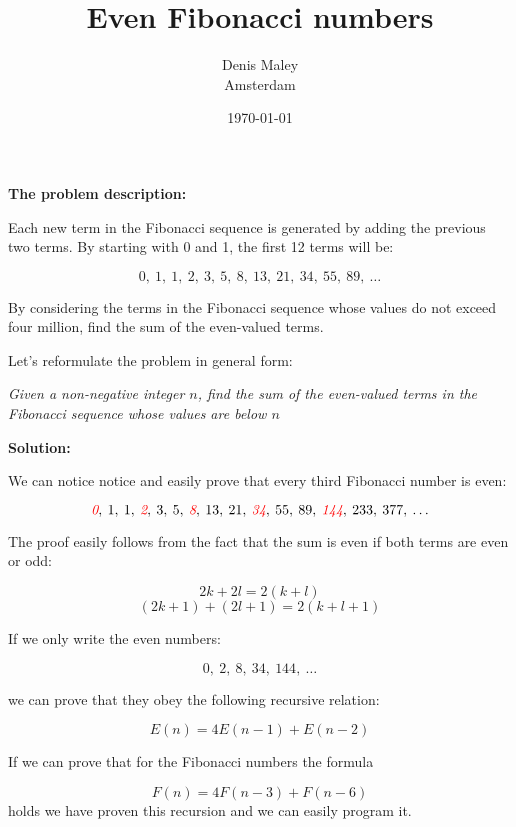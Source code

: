 \documentclass[12pt]{article}
\title{Even Fibonacci numbers}
\author{
Denis Maley  \\
Amsterdam  \\
}
\date{\today}
\begin{document}
\maketitle

\textbf{\large The problem description:}

\bigskip

Each new term in the Fibonacci sequence is generated by adding the 
previous two terms. 
By starting with 0 and 1, the first 12 terms will be:

$$0,\> 1,\> 1,\> 2,\> 3,\> 5,\> 8,\> 13,\> 21,\> 34,\> 55,\> 89,\> \ldots$$

By considering the terms in the Fibonacci sequence whose values do 
not exceed four million, find the sum of the even-valued terms.

\bigskip

Let's reformulate the problem in general form:

\bigskip

\textit{
Given a non-negative integer $n$, find the sum of the even-valued terms 
in the Fibonacci sequence whose values are below $n$
}

\bigskip


\newpage

\textbf{\large Solution:}

\bigskip    



We can notice notice and easily prove that every third Fibonacci number is even:

$$
\textit{\color{red} 0},\> 1,\> 1,\> 
\textit{\color{red} 2},\> 3,\> 5,\> 
\textit{\color{red} 8},\> 13,\> 21,\> 
\textit{\color{red} 34},\> 55,\> 89,\> 
\textit{\color{red} 144},\> 233,\> 377,\> \ldots
$$

The proof easily follows from the fact that the sum is even 
if both terms are even or odd:

$$2k + 2l = 2(k+l)$$
$$(2k+1) + (2l+1) = 2(k+l+1)$$

\bigskip

If we only write the even numbers: 

$$0,\> 2,\> 8,\> 34,\> 144,\> \ldots$$

we can prove that they obey the following recursive relation: 

$$E(n)=4E(n-1)+E(n-2)$$

If we can prove that for the Fibonacci numbers the formula 

$$F(n)=4F(n-3)+F(n-6)$$ 
holds we have proven this recursion and we can easily program it.
\end{document}
